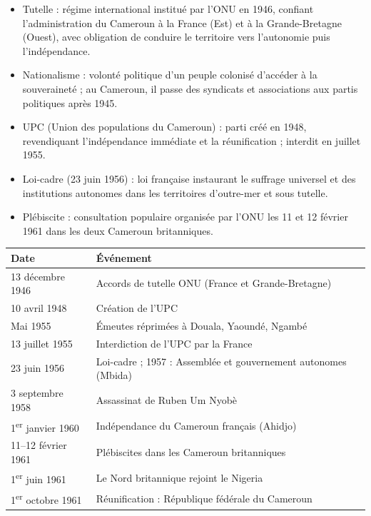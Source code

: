 \documentclass[11pt]{article}
\newcommand{\cle}[1]{{\popxbold\color{popdark}#1}}
\begin{document}
\begin{aretenir}
\begin{itemize}
  \item \cle{Tutelle} : régime international institué par l'ONU en 1946, confiant l'administration du Cameroun à la France (Est) et à la Grande-Bretagne (Ouest), avec obligation de conduire le territoire vers l'autonomie puis l'indépendance.
  \item \cle{Nationalisme} : volonté politique d'un peuple colonisé d'accéder à la souveraineté ; au Cameroun, il passe des syndicats et associations aux partis politiques après 1945.
  \item \cle{UPC} (Union des populations du Cameroun) : parti créé en 1948, revendiquant l'indépendance immédiate et la réunification ; interdit en juillet 1955.
  \item \cle{Loi-cadre} (23 juin 1956) : loi française instaurant le suffrage universel et des institutions autonomes dans les territoires d'outre-mer et sous tutelle.
  \item \cle{Plébiscite} : consultation populaire organisée par l'ONU les 11 et 12 février 1961 dans les deux Cameroun britanniques.
\end{itemize}
\end{aretenir}

\begin{aretenir}
\begin{center}
\begin{tabularx}{\linewidth}{|l|X|}\hline
\rowcolor{popblueL} \textbf{Date} & \textbf{Événement} \\ \hline
13 décembre 1946 & Accords de tutelle ONU (France et Grande-Bretagne) \\ \hline
10 avril 1948 & Création de l'UPC \\ \hline
Mai 1955 & Émeutes réprimées à Douala, Yaoundé, Ngambé \\ \hline
13 juillet 1955 & Interdiction de l'UPC par la France \\ \hline
23 juin 1956 & Loi-cadre ; 1957 : Assemblée et gouvernement autonomes (Mbida) \\ \hline
3 septembre 1958 & Assassinat de Ruben Um Nyobè \\ \hline
1\textsuperscript{er} janvier 1960 & Indépendance du Cameroun français (Ahidjo) \\ \hline
11--12 février 1961 & Plébiscites dans les Cameroun britanniques \\ \hline
1\textsuperscript{er} juin 1961 & Le Nord britannique rejoint le Nigeria \\ \hline
1\textsuperscript{er} octobre 1961 & Réunification : République fédérale du Cameroun \\ \hline
\end{tabularx}
\end{center}
\end{aretenir}
\end{document}
